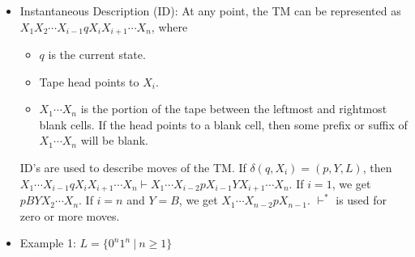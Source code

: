 \documentclass{article}
\begin{document}
\begin{sloppypar}
\begin{itemize}
        \item Instantaneous Description (ID): At any point, the TM can be represented as $X_1X_2\cdots X_{i-1}qX_iX_{i+1}\cdots X_n$, where
        \begin{itemize}
            \item $q$ is the current state.
            \item Tape head points to $X_i$.
            \item $X_1\cdots X_n$ is the portion of the tape between the leftmost and rightmost blank cells. If the head points to a blank cell, then some prefix or suffix of $X_1\cdots X_n$ will be blank.
        \end{itemize}
        ID's are used to describe moves of the TM. If $\delta(q,X_i) = (p,Y,L)$, then $X_1\cdots X_{i-1}qX_iX_{i+1}\cdots X_n \vdash X_1\cdots X_{i-2}pX_{i-1}YX_{i+1}\cdots X_n$. If $i=1$, we get $pBYX_2\cdots X_n$. If $i=n$ and $Y=B$, we get $X_1\cdots X_{n-2}pX_{n-1}$. $\vdash^*$ is used for zero or more moves.

        \item Example 1: $L = \{0^n1^n\ |\ n\ge1\}$
        
        \begin{minipage}{\linewidth}

            \centering

\end{minipage}
\end{itemize}
\end{sloppypar}
\end{document}
